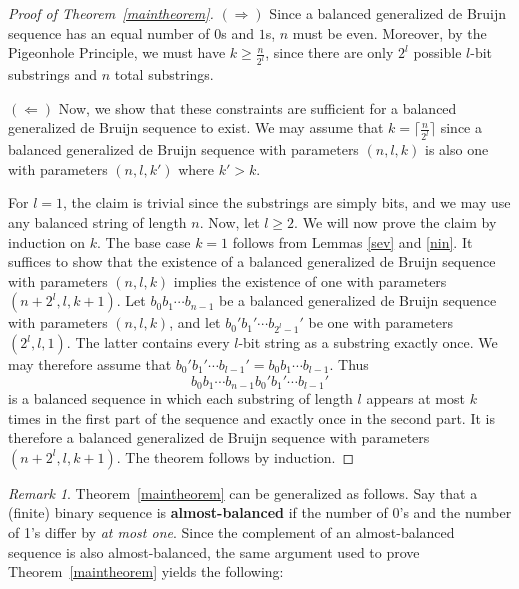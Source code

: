 \documentclass{article}
\theoremstyle{plain}
\newtheorem{theorem}{Theorem}
\theoremstyle{definition}
\theoremstyle{remark}
\newtheorem{remark}[theorem]{Remark}
\begin{document}
\medskip


\begin{proof}[Proof of Theorem~\ref{maintheorem}]
$(\Rightarrow)$ Since a balanced generalized de Bruijn sequence has an equal number of $0$s and $1$s, $n$ must be even. Moreover, by the Pigeonhole Principle, we must have $k \geqslant \frac{n}{2^l}$, since there are only $2^l$ possible $l$-bit substrings and $n$ total substrings.\medskip

$(\Leftarrow)$ Now, we show that these constraints are sufficient for a balanced generalized de Bruijn sequence to exist. We may assume that $k = \lceil \frac{n}{2^l} \rceil$ since a balanced generalized de Bruijn sequence with parameters $(n,l,k)$ is also one with parameters $(n,l,k')$ where $k'>k$. \medskip

For $l=1$, the claim is trivial since the substrings are simply bits, and we may use any balanced string of length $n$. Now, let $l \geqslant 2$. We will now prove the claim by induction on $k$. The base case $k=1$ follows from Lemmas \ref{sev} and \ref{nin}. It suffices to show that the existence of a balanced generalized de Bruijn sequence with parameters $(n,l,k)$ implies the existence of one with parameters $(n+2^l,l,k+1)$. Let $b_0b_1\cdots b_{n-1}$ be a balanced generalized de Bruijn sequence with parameters $(n,l,k)$, and let $b_0'b_1'\cdots b_{2^l-1}'$ be one with parameters $(2^l,l,1)$. The latter contains every $l$-bit string as a substring exactly once. We may therefore assume that $b_0'b_1'\cdots b_{l-1}' = b_0b_1\cdots b_{l-1}$. Thus
\[b_0b_1\cdots b_{n-1}b_0'b_1'\cdots b_{l-1}'\]
is a balanced sequence in which each substring of length $l$ appears at most $k$ times in the first part of the sequence and exactly once in the second part. It is therefore a balanced generalized de Bruijn sequence with parameters $(n+2^l,l,k+1)$. The theorem follows by induction.
\end{proof}

\begin{remark}
Theorem~\ref{maintheorem} can be generalized as follows.
Say that a (finite) binary sequence is \textbf{almost-balanced} if the number of 0's and the number of 1's differ by \textit{at most one}. Since the complement of an almost-balanced sequence is also almost-balanced, the same argument used to prove Theorem~\ref{maintheorem} yields the following:
\end{remark}
\end{document}
